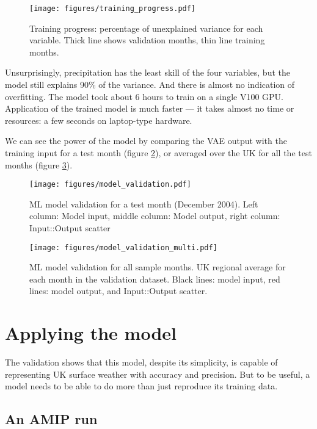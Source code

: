 \documentclass[gmd]{copernicus}
\begin{document}
\begin{figure}[h]
\texttt{[image: figures/training\_progress.pdf]}
\caption{Training progress: percentage of unexplained variance for each variable. Thick line shows validation months, thin line training months.}
\label{training_progress}
\end{figure}
    
Unsurprisingly, precipitation has the least skill of the four variables, but the model still explains 90\% of the variance. And there is almost no indication of overfitting. The model took about 6 hours to train on a single V100 GPU. Application of the trained model is much faster --- it takes almost no time or resources: a few seconds on laptop-type hardware.

We can see the power of the model by comparing the VAE output with the training input for a test month (figure \ref{model_validation}), or averaged over the UK for all the test months (figure \ref{model_validation_multi}).

\begin{figure}[h]
\texttt{[image: figures/model\_validation.pdf]}
\caption{ML model validation for a test month (December 2004). Left column: Model input, middle column: Model output, right column: Input::Output scatter}
\label{model_validation}
\end{figure}


\begin{figure}[h]
\texttt{[image: figures/model\_validation\_multi.pdf]}
\caption{ML model validation for all sample months. UK regional average for each month in the validation dataset. Black lines: model input, red lines: model output, and Input::Output scatter.}
\label{model_validation_multi}
\end{figure}


\section{Applying the model}

The validation shows that this model, despite its simplicity, is capable of representing UK surface weather with accuracy and precision. But to be useful, a model needs to be able to do more than just reproduce its training data.


\subsection{An AMIP run}
\end{document}
